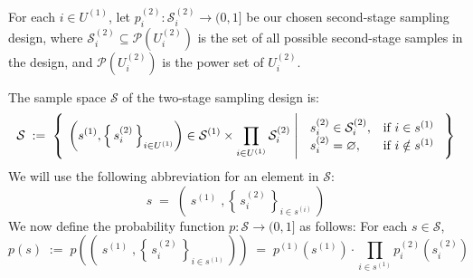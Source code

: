 \documentclass{article}
\begin{document}
\vskip 0.3cm
\noindent
For each $i \in U^{(1)}$, let $p^{(2)}_{i} : \mathcal{S}^{(2)}_{i} \longrightarrow (0,1]$ be our chosen second-stage sampling design,
where $\mathcal{S}^{(2)}_{i} \subseteq \mathcal{P}\!\left(U^{(2)}_{i}\right)$
is the set of all possible second-stage samples in the design, and
$\mathcal{P}\!\left(U^{(2)}_{i}\right)$ is the power set of $U^{(2)}_{i}$.

\vskip 0.3cm
\noindent
The sample space $\mathcal{S}$ of the two-stage sampling design is:
\begin{equation*}
\mathcal{S}
\;:=\;
\left\{\;
\left.\left(s^{(1)},\left\{\,s^{(2)}_{i}\,\right\}_{i\in U^{(1)}}\right) \in \mathcal{S}^{(1)} \times \prod_{i \in U^{(1)}}\mathcal{S}^{(2)}_{i}\;\right\vert\;
\begin{array}{ll}
s^{(2)}_{i} \in \mathcal{S}^{(2)}_{i}, &\textnormal{if $i \in s^{(1)}$}
\\
s^{(2)}_{i} = \varnothing, & \textnormal{if $i \notin s^{(1)}$}
\end{array}
\;\right\}
\end{equation*}
We will use the following abbreviation for an element in $\mathcal{S}$:
\begin{equation*}
s \;=\; \left(\;s^{(1)}\;,\left\{\,s^{(2)}_{i}\,\right\}_{i \in s^{(i)}}\,\right)
\end{equation*}
We now define the probability function $p : \mathcal{S} \longrightarrow (0,1]$ as follows:
For each $s \in \mathcal{S}$,
\begin{equation}
\label{twoStageSampleProbability}
p(s)
\;:=\; p\left(\left(\;s^{(1)}\;,\left\{\,s^{(2)}_{i}\,\right\}_{i \in s^{(1)}}\,\right)\right)
\;=\; p^{(1)}\!\left(s^{(1)}\right)\cdot\prod_{i\in s^{(1)}}p^{(2)}_{i}\!\left(s^{(2)}_{i}\right)
\end{equation}
\end{document}
